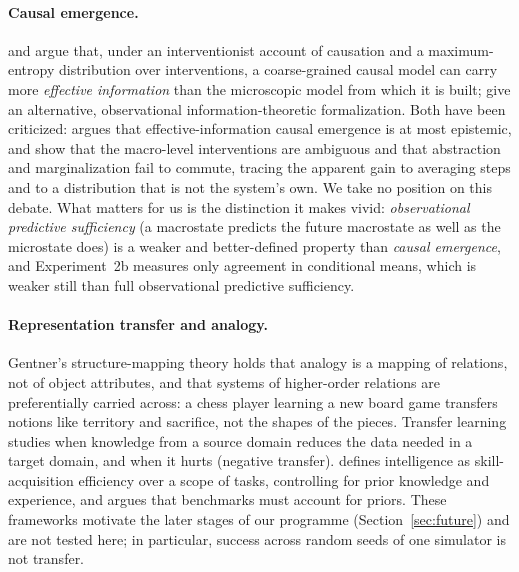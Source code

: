 \documentclass[11pt,a4paper]{article}
\begin{document}
\paragraph{Causal emergence.}
\citet{hoel2013} and \citet{hoel2017} argue that, under an interventionist
account of causation and a maximum-entropy distribution over interventions, a
coarse-grained causal model can carry more \emph{effective information} than
the microscopic model from which it is built; \citet{rosas2020} give an
alternative, observational information-theoretic formalization. Both have been
criticized: \citet{dewhurst2021} argues that effective-information causal
emergence is at most epistemic, and \citet{eberhardt2022} show that the
macro-level interventions are ambiguous and that abstraction and
marginalization fail to commute, tracing the apparent gain to averaging steps
and to a distribution that is not the system's own. We take no position on
this debate. What matters for us is the distinction it makes vivid:
\emph{observational predictive sufficiency} (a macrostate predicts the future
macrostate as well as the microstate does) is a weaker and better-defined
property than \emph{causal emergence}, and Experiment~2b measures only agreement in conditional means, which is weaker
still than full observational predictive sufficiency.

\paragraph{Representation transfer and analogy.}
Gentner's structure-mapping theory \citep{gentner1983} holds that analogy is a
mapping of relations, not of object attributes, and that systems of
higher-order relations are preferentially carried across: a chess player
learning a new board game transfers notions like territory and sacrifice, not
the shapes of the pieces. Transfer learning \citep{pan2010} studies when
knowledge from a source domain reduces the data needed in a target domain, and
when it hurts (negative transfer). \citet{chollet2019} defines intelligence as
skill-acquisition efficiency over a scope of tasks, controlling for prior
knowledge and experience, and argues that benchmarks must account for priors.
These frameworks motivate the later stages of our programme
(Section~\ref{sec:future}) and are not tested here; in particular, success
across random seeds of one simulator is not transfer.
\end{document}
